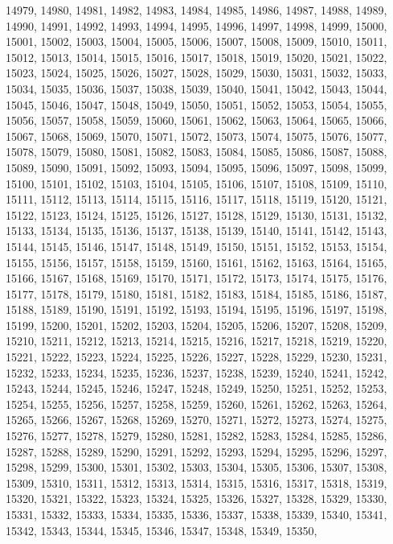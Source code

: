 14979,
14980,
14981,
14982,
14983,
14984,
14985,
14986,
14987,
14988,
14989,
14990,
14991,
14992,
14993,
14994,
14995,
14996,
14997,
14998,
14999,
15000,
15001,
15002,
15003,
15004,
15005,
15006,
15007,
15008,
15009,
15010,
15011,
15012,
15013,
15014,
15015,
15016,
15017,
15018,
15019,
15020,
15021,
15022,
15023,
15024,
15025,
15026,
15027,
15028,
15029,
15030,
15031,
15032,
15033,
15034,
15035,
15036,
15037,
15038,
15039,
15040,
15041,
15042,
15043,
15044,
15045,
15046,
15047,
15048,
15049,
15050,
15051,
15052,
15053,
15054,
15055,
15056,
15057,
15058,
15059,
15060,
15061,
15062,
15063,
15064,
15065,
15066,
15067,
15068,
15069,
15070,
15071,
15072,
15073,
15074,
15075,
15076,
15077,
15078,
15079,
15080,
15081,
15082,
15083,
15084,
15085,
15086,
15087,
15088,
15089,
15090,
15091,
15092,
15093,
15094,
15095,
15096,
15097,
15098,
15099,
15100,
15101,
15102,
15103,
15104,
15105,
15106,
15107,
15108,
15109,
15110,
15111,
15112,
15113,
15114,
15115,
15116,
15117,
15118,
15119,
15120,
15121,
15122,
15123,
15124,
15125,
15126,
15127,
15128,
15129,
15130,
15131,
15132,
15133,
15134,
15135,
15136,
15137,
15138,
15139,
15140,
15141,
15142,
15143,
15144,
15145,
15146,
15147,
15148,
15149,
15150,
15151,
15152,
15153,
15154,
15155,
15156,
15157,
15158,
15159,
15160,
15161,
15162,
15163,
15164,
15165,
15166,
15167,
15168,
15169,
15170,
15171,
15172,
15173,
15174,
15175,
15176,
15177,
15178,
15179,
15180,
15181,
15182,
15183,
15184,
15185,
15186,
15187,
15188,
15189,
15190,
15191,
15192,
15193,
15194,
15195,
15196,
15197,
15198,
15199,
15200,
15201,
15202,
15203,
15204,
15205,
15206,
15207,
15208,
15209,
15210,
15211,
15212,
15213,
15214,
15215,
15216,
15217,
15218,
15219,
15220,
15221,
15222,
15223,
15224,
15225,
15226,
15227,
15228,
15229,
15230,
15231,
15232,
15233,
15234,
15235,
15236,
15237,
15238,
15239,
15240,
15241,
15242,
15243,
15244,
15245,
15246,
15247,
15248,
15249,
15250,
15251,
15252,
15253,
15254,
15255,
15256,
15257,
15258,
15259,
15260,
15261,
15262,
15263,
15264,
15265,
15266,
15267,
15268,
15269,
15270,
15271,
15272,
15273,
15274,
15275,
15276,
15277,
15278,
15279,
15280,
15281,
15282,
15283,
15284,
15285,
15286,
15287,
15288,
15289,
15290,
15291,
15292,
15293,
15294,
15295,
15296,
15297,
15298,
15299,
15300,
15301,
15302,
15303,
15304,
15305,
15306,
15307,
15308,
15309,
15310,
15311,
15312,
15313,
15314,
15315,
15316,
15317,
15318,
15319,
15320,
15321,
15322,
15323,
15324,
15325,
15326,
15327,
15328,
15329,
15330,
15331,
15332,
15333,
15334,
15335,
15336,
15337,
15338,
15339,
15340,
15341,
15342,
15343,
15344,
15345,
15346,
15347,
15348,
15349,
15350,
